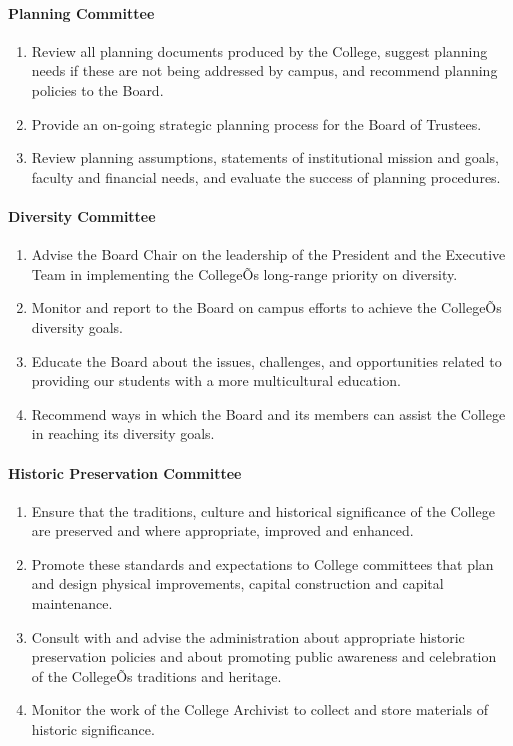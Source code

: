 \documentclass[letterpaper, 11pt]{article}
\begin{document}
			\paragraph{Planning Committee}
				\begin{enumerate}[label=\alph*)]
					\item{Review all planning documents produced by the College, suggest planning needs if these are not being addressed by campus, and recommend planning policies to the Board.}
					\item{Provide an on-going strategic planning process for the Board of Trustees.}
					\item{Review planning assumptions, statements of institutional mission and goals, faculty and financial needs, and evaluate the success of planning procedures.}
				\end{enumerate}
			\paragraph{Diversity Committee}
				\begin{enumerate}[label=\alph*)]
					\item{Advise the Board Chair on the leadership of the President and the Executive Team in implementing the CollegeÕs long-range priority on diversity.}
					\item{Monitor and report to the Board on campus efforts to achieve the CollegeÕs diversity goals.}
					\item{Educate the Board about the issues, challenges, and opportunities related to providing our students with a more multicultural education.}
					\item{Recommend ways in which the Board and its members can assist the College in reaching its diversity goals.}
				\end{enumerate}
			\paragraph{Historic Preservation Committee}
				\begin{enumerate}[label=\alph*)]
					\item{Ensure that the traditions, culture and historical significance of the College are preserved and where appropriate, improved and enhanced.}
					\item{Promote these standards and expectations to College committees that plan and design physical improvements, capital construction and capital maintenance.}
					\item{Consult with and advise the administration about appropriate historic preservation policies and about promoting public awareness and celebration of the CollegeÕs traditions and heritage.}
					\item{Monitor the work of the College Archivist to collect and store materials of historic significance.}
				\end{enumerate}
\end{document}
